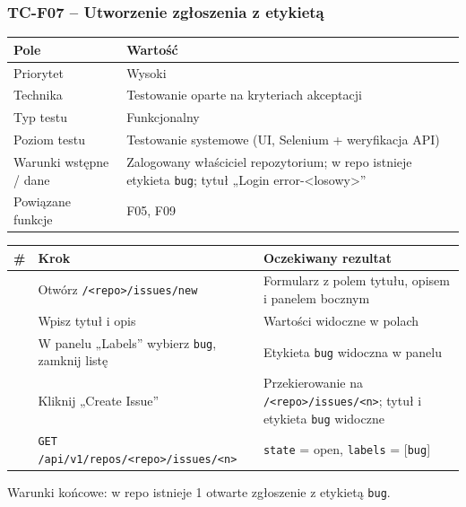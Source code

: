 \subsubsection{TC-F07 – Utworzenie zgłoszenia z etykietą}
{\small
\par\smallskip\noindent\begin{tabular}{>{\raggedright\arraybackslash}p{}>{\raggedright\arraybackslash}p{}}
\toprule
\textbf{Pole} & \textbf{Wartość} \\
\midrule
Priorytet & Wysoki \\
Technika & Testowanie oparte na kryteriach akceptacji \\
Typ testu & Funkcjonalny \\
Poziom testu & Testowanie systemowe (UI, Selenium + weryfikacja API) \\
Warunki wstępne / dane & Zalogowany właściciel repozytorium; w repo istnieje etykieta \texttt{bug}; tytuł „Login error-<losowy>” \\
Powiązane funkcje & F05, F09 \\
\bottomrule
\end{tabular}\par\smallskip
}
{\small
\par\smallskip\noindent\begin{tabular}{>{\raggedright\arraybackslash}p{}>{\raggedright\arraybackslash}p{}>{\raggedright\arraybackslash}p{}}
\toprule
\textbf{\#} & \textbf{Krok} & \textbf{Oczekiwany rezultat} \\
\midrule
1 & Otwórz \texttt{/\allowbreak{}<repo>/\allowbreak{}issues/\allowbreak{}new} & Formularz z polem tytułu, opisem i panelem bocznym \\
2 & Wpisz tytuł i opis & Wartości widoczne w polach \\
3 & W panelu „Labels” wybierz \texttt{bug}, zamknij listę & Etykieta \texttt{bug} widoczna w panelu \\
4 & Kliknij „Create Issue” & Przekierowanie na \texttt{/\allowbreak{}<repo>/\allowbreak{}issues/\allowbreak{}<n>}; tytuł i etykieta \texttt{bug} widoczne \\
5 & \texttt{GET /\allowbreak{}api/\allowbreak{}v1/\allowbreak{}repos/\allowbreak{}<repo>/\allowbreak{}issues/\allowbreak{}<n>} & \texttt{state} = open, \texttt{labels} = [\texttt{bug}] \\
\bottomrule
\end{tabular}\par\smallskip
}
Warunki końcowe: w repo istnieje 1 otwarte zgłoszenie z etykietą \texttt{bug}.

